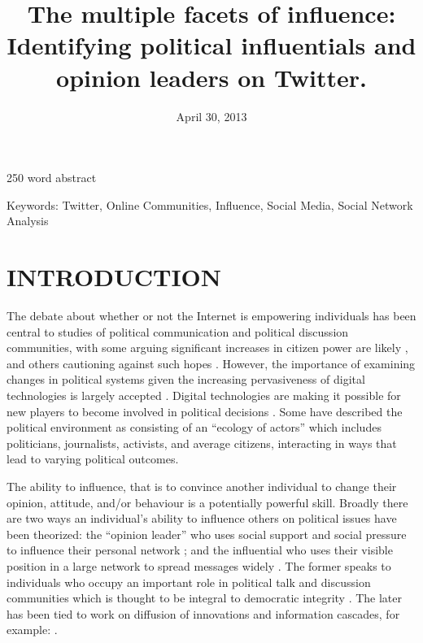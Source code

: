 \documentclass[a4paper,12pt]{article}
\title{The multiple facets of influence: Identifying political influentials and opinion leaders on Twitter. }
\date{April 30, 2013}
\author{}
\begin{document}
\maketitle

\onehalfspacing
\newcommand{\specialcell}[2][c]{%
  \begin{tabular}[#1]{@{}c@{}}#2\end{tabular}}

 

250 word abstract

Keywords:
Twitter, Online Communities, Influence, Social Media, Social Network Analysis


\section{INTRODUCTION}

The debate about whether or not the Internet is empowering individuals has been central to studies of political communication and political discussion communities, with some arguing significant increases in citizen power are likely \cite{Blumler2001, dahlgren00, dahlgren05}, and others cautioning against such hopes \cite{hindman}. However, the importance of examining changes in political systems given the increasing pervasiveness of digital technologies is largely accepted \cite{agre}. Digital technologies are making it possible for new players to become involved in political decisions \cite{DuboisDutton2013}. Some have described the political environment as consisting of an ``ecology of actors'' \cite{DuttonPeltu2007} which includes politicians, journalists, activists, and average citizens, interacting in ways that lead to varying political outcomes. 

The ability to influence, that is to convince another individual to change their opinion, attitude, and/or behaviour is a potentially powerful skill. Broadly there are two ways an individual's ability to influence others on political issues have been theorized: the ``opinion leader'' who uses social support and social pressure to influence their personal network \cite{katzlazarsfeld}; and the influential who uses their visible position in a large network to spread messages widely \cite{rogers4th}. The former speaks to individuals who occupy an important role in political talk and discussion communities which is thought to be integral to democratic integrity \cite{Dillard1989, DillardSegrinHarden1989, Mutz2006}. The later has been tied to work on diffusion of innovations and information cascades, for example: \cite{rogers4th, Bakshy, LermanGhosh2011}.
\end{document}
